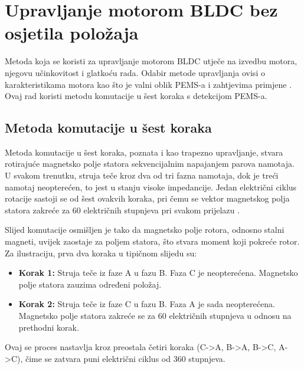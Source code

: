 \documentclass[diplomskirad]{fer}
\begin{document}
\newpage

\chapter{Upravljanje motorom BLDC bez osjetila položaja}
\label{pog:bldc_upravljanje_bez_senzora}

Metoda koja se koristi za upravljanje motorom BLDC utječe na izvedbu motora,
njegovu učinkovitost i glatkoću rada. Odabir metode upravljanja ovisi o
karakteristikama motora kao što je valni oblik PEMS-a i zahtjevima primjene
\cite{cite:bldc}. Ovaj rad koristi metodu komutacije u šest koraka s detekcijom
PEMS-a.

\section{Metoda komutacije u šest koraka}
\label{sec:six-step}

Metoda komutacije u šest koraka, poznata i kao trapezno upravljanje, stvara
rotirajuće magnetsko polje statora sekvencijalnim napajanjem parova namotaja. U
svakom trenutku, struja teče kroz dva od tri fazna namotaja, dok je treći
namotaj neopterećen, to jest u stanju visoke impedancije. Jedan električni
ciklus rotacije sastoji se od šest ovakvih koraka, pri čemu se vektor
magnetskog polja statora zakreće za 60 električnih stupnjeva pri svakom
prijelazu \cite{cite:bldc, NXP_AN2355}.

Slijed komutacije osmišljen je tako da magnetsko polje rotora, odnosno stalni
magneti, uvijek zaostaje za poljem statora, što stvara moment koji pokreće
rotor. Za ilustraciju, prva dva koraka u tipičnom slijedu su:

\begin{itemize}
	\item \textbf{Korak 1:} Struja teče iz faze A u fazu B. Faza C je neopterećena. Magnetsko polje statora zauzima određeni položaj.

	\item \textbf{Korak 2:} Struja teče iz faze C u fazu B. Faza A je sada neopterećena. Magnetsko polje statora zakreće se za 60 električnih stupnjeva u odnosu na prethodni korak.
\end{itemize}

Ovaj se proces nastavlja kroz preostala četiri koraka (C->A, B->A, B->C, A->C),
čime se zatvara puni električni ciklus od 360 stupnjeva. 
\end{document}

